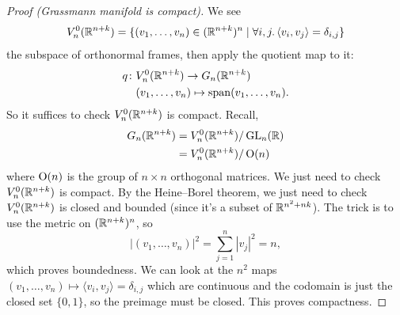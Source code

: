 
\lecture{}

\begin{proof}[Proof (Grassmann manifold is compact)]
We see
\begin{equation}
V_{n}^{0}(\mathbb{R}^{n+k})=\{(v_{1},\dots,v_{n})\in(\mathbb{R}^{n+k})^{n}\mid\forall i,j\ldotp\langle v_{i},v_{j}\rangle=\delta_{i,j}\}
\end{equation}
the subspace of orthonormal frames, then apply the quotient map to it:
\begin{align}
q\colon & V^{0}_{n}(\mathbb{R}^{n+k})\to G_{n}(\mathbb{R}^{n+k})\\
& (v_{1},\dots,v_{n})\mapsto\operatorname{span}(v_{1},\dots,v_{n}).\nonumber
\end{align}
So it suffices to check $V^{0}_{n}(\mathbb{R}^{n+k})$ is compact. Recall,
\begin{subequations}
  \begin{align}
G_{n}(\mathbb{R}^{n+k}) &= V^{0}_{n}(\mathbb{R}^{n+k})/\operatorname{GL}_{n}(\mathbb{R})\\
&= V^{0}_{n}(\mathbb{R}^{n+k})/\operatorname{O}(n)
  \end{align}
\end{subequations}
where $\operatorname{O}(n)$ is the group of $n\times n$ orthogonal matrices. We
just need to check $V^{0}_{n}(\mathbb{R}^{n+k})$ is compact. By the
Heine--Borel theorem, we just need to check $V^{0}_{n}(\mathbb{R}^{n+k})$ is
closed and bounded (since it's a subset of $\mathbb{R}^{n^{2}+nk}$). The
trick is to use the metric on $(\mathbb{R}^{n+k})^{n}$, so
\begin{equation}
|(v_{1},\dots,v_{n})|^{2}=\sum^{n}_{j=1}|v_{j}|^{2}=n,
\end{equation}
which proves boundedness. We can look at the $n^{2}$ maps
$(v_{1},\dots,v_{n})\mapsto\langle v_{i},v_{j}\rangle=\delta_{i,j}$
which are continuous and the codomain is just the closed set
$\{0,1\}$, so the preimage must be closed. This proves compactness.
\end{proof}

